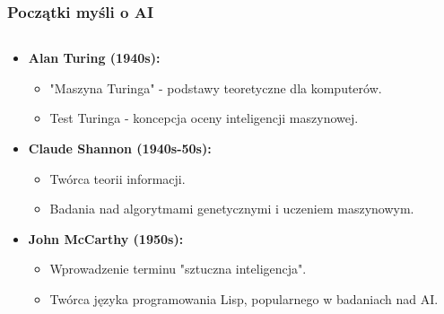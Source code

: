 \documentclass[smaller]{beamer}
\begin{document}

\begin{frame}
\frametitle{Początki myśli o AI}

\begin{columns}
    \begin{column}{0.6\textwidth}
        \begin{itemize}
            \item \textbf{Alan Turing (1940s):}
            \begin{itemize}
                \item "Maszyna Turinga" - podstawy teoretyczne dla komputerów.
                \item Test Turinga - koncepcja oceny inteligencji maszynowej.
            \end{itemize}
            \item \textbf{Claude Shannon (1940s-50s):}
            \begin{itemize}
                \item Twórca teorii informacji.
                \item Badania nad algorytmami genetycznymi i uczeniem maszynowym.
            \end{itemize}
            \item \textbf{John McCarthy (1950s):}
            \begin{itemize}
                \item Wprowadzenie terminu "sztuczna inteligencja".
                \item Twórca języka programowania Lisp, popularnego w badaniach nad AI.
            \end{itemize}
        \end{itemize}
    \end{column}


\end{columns}
\end{frame}
\end{document}
